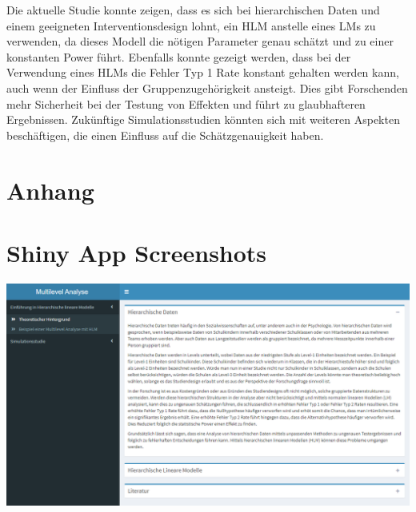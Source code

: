 \documentclass[12pt]{article}\usepackage[]{graphicx}\usepackage[]{color}
\begin{document}
Die aktuelle Studie konnte zeigen, dass es sich bei hierarchischen Daten und einem geeigneten Interventionsdesign lohnt, ein HLM anstelle eines LMs zu verwenden, da dieses Modell die nötigen Parameter genau schätzt und zu einer konstanten Power führt. Ebenfalls konnte gezeigt werden, dass bei der Verwendung eines HLMs die Fehler Typ 1 Rate konstant gehalten werden kann, auch wenn der Einfluss der Gruppenzugehörigkeit ansteigt. Dies gibt Forschenden mehr Sicherheit bei der Testung von Effekten und führt zu glaubhafteren Ergebnissen. Zukünftige Simulationsstudien könnten sich mit weiteren Aspekten beschäftigen, die einen Einfluss auf die Schätzgenauigkeit haben.





\newpage
\singlespacing




\section{Anhang}
\appendix
\section*{Shiny App Screenshots}
\begin{center}
\includegraphics[scale=0.5]{./figures/app_theory}
\end{center}
\end{document}
